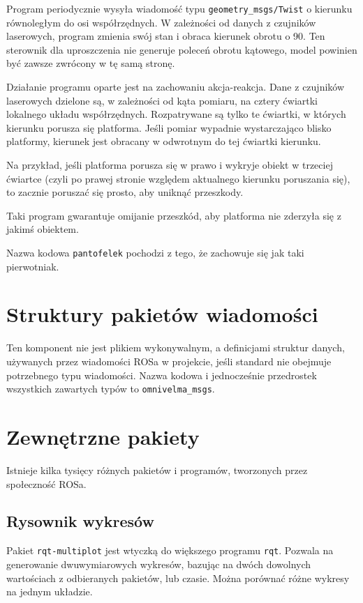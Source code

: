 	Program periodycznie wysyła wiadomość typu \texttt{geometry\_msgs/Twist} o kierunku równoległym do osi współrzędnych.
	W zależności od danych z czujników laserowych, program zmienia swój stan i obraca kierunek obrotu o 90\textdegree.
	Ten sterownik dla uproszczenia nie generuje poleceń obrotu kątowego, model powinien być zawsze zwrócony w tę samą stronę.
	
	Działanie programu oparte jest na zachowaniu akcja-reakcja.
	Dane z czujników laserowych dzielone są, w zależności od kąta pomiaru, na cztery ćwiartki lokalnego układu współrzędnych.
	Rozpatrywane są tylko te ćwiartki, w których kierunku porusza się platforma.
	Jeśli pomiar wypadnie wystarczająco blisko platformy, kierunek jest obracany w odwrotnym do tej ćwiartki kierunku.
	
	Na przykład, jeśli platforma porusza się w prawo i wykryje obiekt w trzeciej ćwiartce (czyli po prawej stronie względem aktualnego kierunku poruszania się),
	to zacznie poruszać się prosto, aby uniknąć przeszkody.
	
	Taki program gwarantuje omijanie przeszkód, aby platforma nie zderzyła się z jakimś obiektem.
	
	Nazwa kodowa \texttt{pantofelek} pochodzi z tego, że zachowuje się jak taki pierwotniak.
	
\section{Struktury pakietów wiadomości}
	Ten komponent nie jest plikiem wykonywalnym, a definicjami struktur danych, używanych przez wiadomości ROSa w projekcie, jeśli 
	standard nie obejmuje potrzebnego typu wiadomości.
	Nazwa kodowa i jednocześnie przedrostek wszystkich zawartych typów to \texttt{omnivelma\_msgs}.

\section{Zewnętrzne pakiety}
	Istnieje kilka tysięcy różnych pakietów i programów, tworzonych przez społeczność ROSa.
	
	\subsection{Rysownik wykresów}
		Pakiet \texttt{rqt-multiplot} jest wtyczką do większego programu \texttt{rqt}.
		Pozwala na generowanie dwuwymiarowych wykresów, bazując na dwóch dowolnych wartościach z odbieranych pakietów, lub czasie.
		Można porównać różne wykresy na jednym układzie.
		
